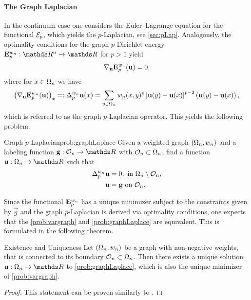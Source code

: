 \paragraph{The Graph Laplacian}
%
In the continuum case one considers the Euler--Lagrange equation for the functional $\mathcal{E}_p$, which yields the 
$p$-Laplacian, see \cref{sec:pLap}. Analogously, the optimality conditions for the graph $p$-Dirichlet energy $\GE^{w_n}_p:\R^n\to\R$ for $p > 1$ yield
%
\begin{align*}
\nabla_{\mathbf{u}} \mathbf{E}^{w_n}_p(\mathbf{u}) = 0,
\end{align*}
%
where for $x\in\Omega_n$ we have 
\begin{align*}
\left(\nabla_{\mathbf{u}} \mathbf{E}^{w_n}_p(\mathbf{u})\right)_x =:\Delta^{w_n}_p \mathbf{u}(x)= \sum_{y\in\Omega_n} w_n(x,y)^p \left|\mathbf{u}(y) - \mathbf{u}(x)\right|^{p-2} \left( \mathbf{u}(y) - \mathbf{u}(x) \right),
\end{align*}
%
which is referred to as the graph $p$-Laplacian operator. This yields the following problem.
%
\begin{problem}{Graph $p$-Laplacian}{prob:graphLaplace}
	Given a weighted graph $(\Omega_n, w_n)$ and a labeling function $\vec g:\conset_n\to\R$ with $\mathcal{O}_n\subset\Omega_n$, find 
	a function $\vec u:\domain_n\to\R$ such that
	\begin{align*}
		\Delta_p^{w_n} \mathbf{u} &= 0, \text{ in } \Omega_n\setminus \mathcal{O}_n,\\
		\mathbf{u} &= \mathbf{g} \text{ on } \mathcal{O}_n.
	\end{align*}
\end{problem}
%
\noindent%
Since the functional $\mathbf{E}^{w_n}_p$ has a unique minimizer subject to the constraints given by $\vec g$ and the graph $p$-Laplacian is derived 
via optimality conditions, one expects that the \cref{prob:vargraph} and \cref{prob:graphLaplace} are equivalent. This is formulated in the following 
theorem.
%
\begin{theorem}{Existence and Uniqueness}{}
Let $(\Omega_n,w_n)$ be a graph with non-negative weights, that is connected to its boundary $\mathcal{O}_n\subset\Omega_n$. Then there exists a unique solution $\vec u:\domain_n\to\R$ to \cref{prob:graphLaplace}, which is also the unique minimizer of \cref{prob:vargraph}.
\end{theorem}
%
\begin{proof}
This statement can be proven similarly to \cite[Theorem 5.3]{elmoataz2015p}.
\end{proof}
%
%
%
%
%
